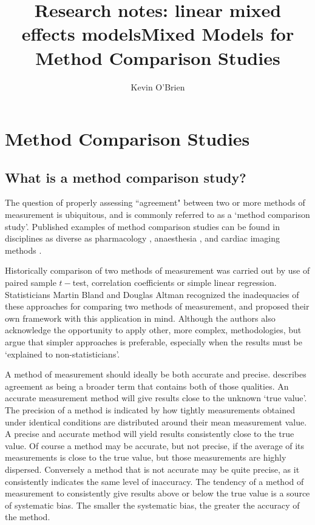 \documentclass[12pt, a4paper]{report}
\title{Research notes: linear mixed effects models}
\author{ } \date{ }
\theoremstyle{plain}
\theoremstyle{definition}
\theoremstyle{remark}
\begin{document}
	\author{Kevin O'Brien}
	\title{Mixed Models for Method Comparison Studies}
	\tableofcontents
	
	\newpage
	\chapter{Method Comparison Studies}
	
	
	\section{What is a method comparison study?}


The question of properly assessing ``agreement" between two or more methods of measurement is ubiquitous, and is commonly referred to as a `method comparison study'. Published examples of method comparison studies can be found in disciplines
as diverse as pharmacology \citep{ludbrook97}, anaesthesia \citep{Myles}, and cardiac imaging methods \citep{Krumm}.
	
Historically comparison of two methods of measurement was carried out by use of paired sample $t-$test, correlation coefficients or simple linear regression. Statisticians Martin Bland and Douglas Altman recognized the inadequacies of these approaches for comparing two methods of measurement, and proposed their own framework with this application in mind. Although the authors also acknowledge the opportunity to apply other, more complex, methodologies, but argue that simpler approaches is preferable, especially when the
results must be `explained to non-statisticians'.


A method of measurement should ideally be both accurate and
precise. \citet{Barnhart} describes agreement as being a broader
term that contains both of those qualities. An accurate
measurement method will give results close to the unknown `true
value'. The precision of a method is indicated by how tightly
measurements obtained under identical conditions are distributed
around their mean measurement value. A precise and accurate method
will yield results consistently close to the true value. Of course
a method may be accurate, but not precise, if the average of its
measurements is close to the true value, but those measurements
are highly dispersed. Conversely a method that is not accurate may
be quite precise, as it consistently indicates the same level of
inaccuracy. The tendency of a method of measurement to
consistently give results above or below the true value is a
source of systematic bias. The smaller the systematic bias, the
greater the accuracy of the method.
\end{document}
